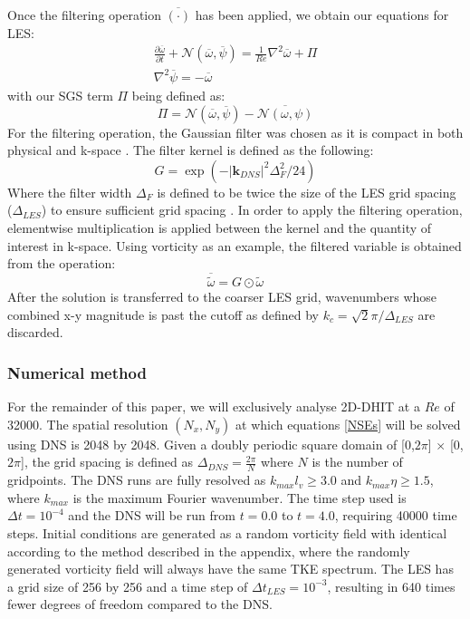 \documentclass[conf]{new-aiaa}
\begin{document}
Once the filtering operation $\overline{(\cdot)}$ has been applied, we obtain our equations for LES:
\begin{subequations}
    \begin{gather}
        \frac{\partial \overline{\omega}}{\partial t} + \mathcal{N}(\overline{\omega},\overline{\psi})=\frac{1}{Re}\nabla^{2}\overline{\omega}+\Pi\\
        \nabla^{2}\overline{\psi}=-\overline{\omega}
    \end{gather}
\end{subequations}
with our SGS term $\Pi$ being defined as:
\begin{equation}
    \Pi = \mathcal{N}(\overline{\omega},\overline{\psi})-\overline{\mathcal{N}(\omega,\psi)}
\end{equation}
For the filtering operation, the Gaussian filter was chosen as it is compact in both physical and k-space \cite{2022_LES_CNN,pope2000turbulent}. The filter kernel is defined as the following:
\begin{equation}
    G = \exp (- {| \mathbf{k}_{DNS}\vert}^2 {\Delta}^2_{F} /24)
\end{equation}
Where the filter width ${\Delta}_{F}$ is defined to be twice the size of the LES grid spacing (${\Delta}_{LES}$) to ensure sufficient grid spacing \cite{pope2000turbulent}.
In order to apply the filtering operation, elementwise multiplication is applied between the kernel and the quantity of interest in k-space. Using vorticity as an example, the filtered variable is obtained from the operation:
\begin{equation}
   \overline{\tilde{\omega}} = G \odot \tilde{\omega}
\end{equation}
After the solution is transferred to the coarser LES grid, wavenumbers whose combined x-y magnitude is past the cutoff as defined by $k_{c} = \sqrt{2}\pi /{\Delta}_{LES} $ are discarded. 

\subsubsection{Numerical method}
For the remainder of this paper, we will exclusively analyse 2D-DHIT at a $Re$ of 32000. The spatial resolution $(N_{x},N_{y})$ at which equations \eqref{NSEs} will be solved using DNS is 2048 by 2048. Given a doubly periodic square domain of [0,$2\pi$] $\times$ [0,$2\pi$], the grid spacing is defined as $\Delta_{DNS} = \frac{2\pi}{N}$ where $N$ is the number of gridpoints. The DNS runs are fully resolved as $k_{max}l_{v}\geq 3.0$ and $k_{max}\eta \geq 1.5$, where $k_{max}$ is the maximum Fourier wavenumber\cite{kmax_fullresolve}. The time step used is $\Delta t=10^{-4}$ and the DNS will be run from $t=0.0$ to $t=4.0$, requiring 40000 time steps. Initial conditions are generated as a random vorticity field with identical according to the method described in the appendix, where the randomly generated vorticity field will always have the same TKE spectrum. The LES has a grid size of 256 by 256 and a time step of $\Delta t_{LES}=10^{-3}$, resulting in 640 times fewer degrees of freedom compared to the DNS.
\end{document}
